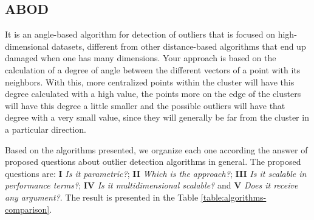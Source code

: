 
\subsection{ABOD}

It is an angle-based algorithm \cite{Kriegel:2008:AOD:1401890.1401946} for detection of outliers that is focused on high-dimensional datasets, different from other distance-based algorithms that end up damaged when one has many dimensions. Your approach is based on the calculation of a degree of angle between the different vectors of a point with its neighbors. With this, more centralized points within the cluster will have this degree calculated with a high value, the points more on the edge of the clusters will have this degree a little smaller and the possible outliers will have that degree with a very small value, since they will generally be far from the cluster in a particular direction.



\vspace{25pt}

Based on the algorithms presented, we organize each one according the answer of proposed questions about outlier detection algorithms in general. The proposed questions are: \textbf{I} \textit{Is it parametric?}; \textbf{II} \textit{Which is the approach?}; \textbf{III} \textit{Is it scalable in performance terms?}; \textbf{IV} \textit{Is it multidimensional scalable?} and \textbf{V} \textit{Does it receive any argument?}. The result is presented in the Table \ref{table:algorithms-comparison}.

